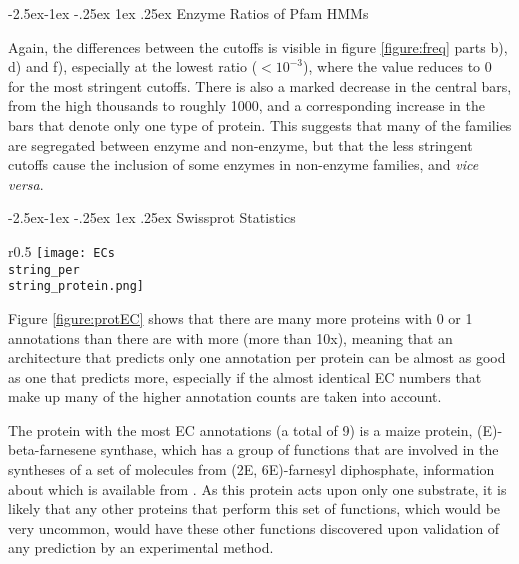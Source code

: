\documentclass[12pt]{article}
\makeatletter
\renewcommand\paragraph{\@startsection{paragraph}{4}{\z@}
            {-2.5ex\@plus -1ex \@minus -.25ex}
            {1ex \@plus .25ex}
            {\normalfont\normalsize\bfseries}}
\renewcommand\subsubsection{\@startsection{subsubsection}{4}{\z@}
            {-2.5ex\@plus -1ex \@minus -.25ex}
            {1ex \@plus .25ex}
            {\normalfont\large\bfseries}}
\makeatother
\begin{document}
			\paragraph{Enzyme Ratios of Pfam HMMs}
			
			Again, the differences between the cutoffs is visible in figure \ref{figure:freq} parts b), d) and f), especially at the lowest ratio ($<10^{-3}$), where the value reduces to 0 for the most stringent cutoffs.  There is also a marked decrease in the central bars, from the high thousands to roughly 1000, and a corresponding increase in the bars that denote only one type of protein.  This suggests that many of the families are segregated between enzyme and non-enzyme, but that the less stringent cutoffs cause the inclusion of some enzymes in non-enzyme families, and \textit{vice versa}.
						
			\subsubsection{Swissprot Statistics}
			
			\begin{wrapfigure}{r}{0.5\textwidth}
			\texttt{[image: ECs\\string\_per\\string\_protein.png]}
			\caption{Plot showing the distribution of numbers of EC annotations per protein.  Many proteins have a few EC annotations, but it rapidly falls off at higher numbers}		
			\label{figure:protEC}
			\end{wrapfigure}
			
			Figure \ref{figure:protEC} shows that there are many more proteins with 0 or 1 annotations than there are with more (more than 10x), meaning that an architecture that predicts only one annotation per protein can be almost as good as one that predicts more, especially if the almost identical EC numbers that make up many of the higher annotation counts are taken into account.
			
			The protein with the most EC annotations (a total of 9) is a maize protein, (E)-beta-farnesene synthase, which has a group of functions that are involved in the syntheses of a set of molecules from (2E, 6E)-farnesyl diphosphate, information about which is available from \cite{RefWorks:doc:5ddc6d45e4b09d547997f032}.  As this protein acts upon only one substrate, it is likely that any other proteins that perform this set of functions, which would be very uncommon, would have these other functions discovered upon validation of any prediction by an experimental method.
			
\end{document}
